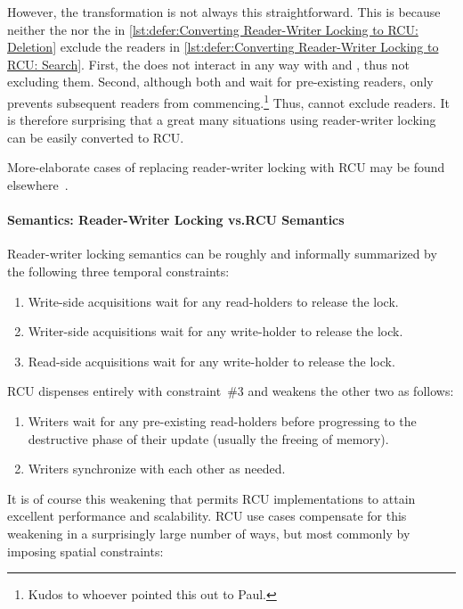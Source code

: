However, the transformation is not always this straightforward.
This is because neither the  nor the
 in
\cref{lst:defer:Converting Reader-Writer Locking to RCU: Deletion}
exclude the readers in
\cref{lst:defer:Converting Reader-Writer Locking to RCU: Search}.
First, the  does not interact in any way with
 and , thus not excluding them.
Second, although both  and 
wait for pre-existing readers, only  prevents
subsequent readers from commencing.\footnote{
	Kudos to whoever pointed this out to Paul.}
Thus,  cannot exclude readers.
It is therefore surprising that a great many situations
using reader-writer locking can be easily converted to RCU\@.

More-elaborate cases of replacing reader-writer locking with RCU
may be found
elsewhere~\cite{NeilBrown2015PathnameLookup,NeilBrown2015RCUwalk}.

\paragraph{Semantics: Reader-Writer Locking vs.\@ RCU Semantics}

Reader-writer locking semantics can be roughly and informally summarized
by the following three temporal constraints:

\begin{enumerate}
\item	Write-side acquisitions wait for any read-holders to release
	the lock.
\item	Writer-side acquisitions wait for any write-holder to release
	the lock.
\item	Read-side acquisitions wait for any write-holder to release
	the lock.
\end{enumerate}

RCU dispenses entirely with constraint~\#3 and weakens the other two
as follows:

\begin{enumerate}
\item	Writers wait for any pre-existing read-holders before progressing
	to the destructive phase of their update (usually the freeing of
	memory).
\item	Writers synchronize with each other as needed.
\end{enumerate}

It is of course this weakening that permits RCU implementations to attain
excellent performance and scalability.
RCU use cases compensate for this weakening in a surprisingly large number
of ways, but most commonly by imposing spatial constraints:

